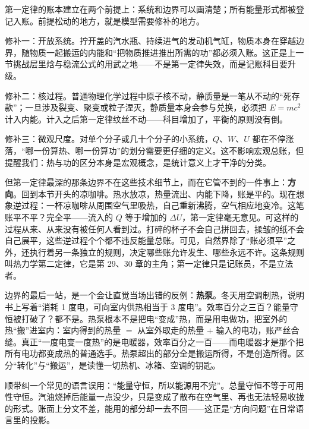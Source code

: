 \begin{mainline}
第一定律的账本建立在两个前提上：系统和边界可以画清楚；所有能量形式都被登记入账。前提松动的地方，就是模型需要修补的地方。

修补一：开放系统。拧开盖的汽水瓶、持续进气的发动机气缸，物质本身在穿越边界，随物质一起搬运的内能和“把物质推进推出所需的功”都必须入账。这正是上一节挑战层里焓与稳流公式的用武之地——不是第一定律失效，而是记账科目要升级。

修补二：核过程。普通物理化学过程中原子核不动，静质量是一笔从不动的“死存款”；一旦涉及裂变、聚变或粒子湮灭，静质量本身会参与兑换，必须把 \(E=mc^2\) 计入内能。计入之后第一定律纹丝不动——科目增加了，平衡的原则没有倒。

修补三：微观尺度。对单个分子或几十个分子的小系统，\(Q\)、\(W\)、\(U\) 都在不停涨落，“哪一份算热、哪一份算功”的划分需要更仔细的定义。这不影响宏观总账，但提醒我们：热与功的区分本身是宏观概念，是统计意义上才干净的分类。

但第一定律最深的那条边界不在这些技术细节上，而在它管不到的一件事上：\textbf{方向}。回到本节开头的凉咖啡。热水放凉，热量流出、内能下降，账是平的。现在想象逆过程：一杯凉咖啡从周围空气里吸热，自己重新沸腾，空气相应地变冷。这笔账平不平？完全平——流入的 \(Q\) 等于增加的 \(\Delta U\)，第一定律毫无意见。可这样的过程从来、从来没有被任何人看到过。打碎的杯子不会自己拼回去，揉皱的纸不会自己展平，这些逆过程个个都不违反能量总账。可见，自然界除了“账必须平”之外，还执行着另一条独立的规则，决定哪些账允许发生、哪些永远不许。这条规则叫热力学第二定律，它是第 29、30 章的主角；第一定律只是记账员，不是立法者。

边界的最后一站，是一个会让直觉当场出错的反例：\textbf{热泵}。冬天用空调制热，说明书上写着“消耗 1 度电，可向室内供热相当于 3 度电”。效率百分之三百？能量守恒被打破了？都不是。热泵根本不是把电“变成”热，而是用电做功，把室外的热“搬”进室内：室内得到的热量 \(=\) 从室外取走的热量 \(+\) 输入的电功，账严丝合缝。真正“一度电变一度热”的是电暖器，效率百分之一百——而电暖器才是那个把所有电功都变成热的普通选手。热泵超出的部分全是搬运所得，不是创造所得。区分“转化”与“搬运”，是读懂一切热机、冰箱、空调的钥匙。

顺带纠一个常见的语言误用：“能量守恒，所以能源用不完”。总量守恒不等于可用性守恒。汽油烧掉后能量一点没少，只是变成了散布在空气里、再也无法轻易收拢的形式。账面上分文不差，能用的部分却一去不回——这正是“方向问题”在日常语言里的投影。
\end{mainline}


